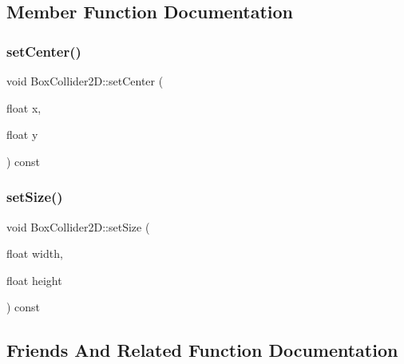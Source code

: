 \subsection{Member Function Documentation}
\hypertarget{class_mason_1_1_box_collider2_d_a4be834b1d746af44174f75e1c92cbbbc}{}\label{class_mason_1_1_box_collider2_d_a4be834b1d746af44174f75e1c92cbbbc} 
\subsubsection{\texorpdfstring{set\+Center()}{setCenter()}}
{\footnotesize\ttfamily void Box\+Collider2\+D\+::set\+Center (\begin{DoxyParamCaption}\item[{float}]{x,  }\item[{float}]{y }\end{DoxyParamCaption}) const}

\hypertarget{class_mason_1_1_box_collider2_d_a57e51f07f4e6baf8533c05268f8ee0ed}{}\label{class_mason_1_1_box_collider2_d_a57e51f07f4e6baf8533c05268f8ee0ed} 
\subsubsection{\texorpdfstring{set\+Size()}{setSize()}}
{\footnotesize\ttfamily void Box\+Collider2\+D\+::set\+Size (\begin{DoxyParamCaption}\item[{float}]{width,  }\item[{float}]{height }\end{DoxyParamCaption}) const}



\subsection{Friends And Related Function Documentation}
\hypertarget{class_mason_1_1_box_collider2_d_a00df87c957d8f7ee0fc51f07a0542f4a}{}\label{class_mason_1_1_box_collider2_d_a00df87c957d8f7ee0fc51f07a0542f4a} 
